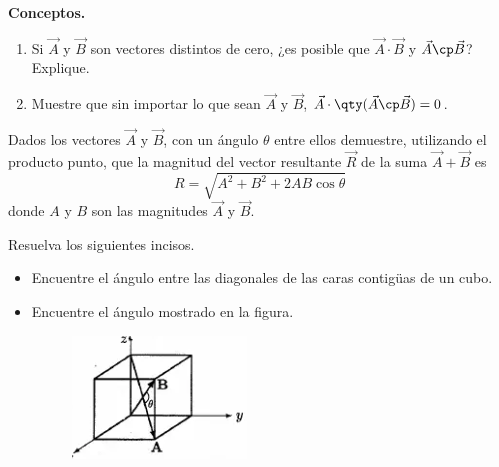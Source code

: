 \begin{mdframed}[style=warning]
	\begin{ejercicio}
		\textbf{Conceptos.}
		\begin{enumerate}
			\item Si $\vec{A}$ y $\vec{B}$ son vectores distintos de cero, ¿es posible que $\vec{A} \cdot \vec{B}$ y $\vec{A} \cp \vec{B}$? Explique.
			\item Muestre que sin importar lo que sean $\vec{A}$ y $\vec{B}$, $\vec{A} \cdot \qty(\vec{A} \cp \vec{B}) = 0$.
		\end{enumerate}
	\end{ejercicio}
\end{mdframed}









\begin{mdframed}[style=warning]
	\begin{ejercicio}
		Dados los vectores $\vec{A}$ y $\vec{B}$, con un ángulo $\theta$ entre ellos demuestre, utilizando el producto punto, que la magnitud del vector resultante $\vec{R}$ de la suma $\vec{A} + \vec{B}$ es
			$$ R = \sqrt{A^2 + B^2 + 2AB\cos{\theta}} $$
		donde $A$ y $B$ son las magnitudes $\vec{A}$ y $\vec{B}$.
	\end{ejercicio}
\end{mdframed}







\begin{mdframed}[style=warning]
	\begin{ejercicio}
	Resuelva los siguientes incisos.
		\begin{itemize}
			\item Encuentre el ángulo entre las diagonales de las caras contigüas de un cubo.
			\begin{center}
				
			\end{center}
			\pagebreak
			\item Encuentre el ángulo mostrado en la figura.
			\begin{figure}[H]
				\centering
				\includegraphics[scale=0.5]{./img/cube.png}
			\end{figure}
		\end{itemize}
	\end{ejercicio}
\end{mdframed}






